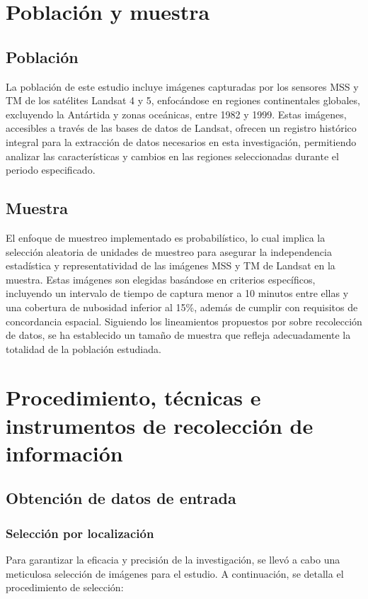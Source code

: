          
    \section{Población y muestra}
    
        \subsection{Población}
            La población de este estudio incluye imágenes capturadas por los sensores MSS y TM de los satélites Landsat 4 y 5, enfocándose en regiones continentales globales, excluyendo la Antártida y zonas oceánicas, entre 1982 y 1999. Estas imágenes, accesibles a través de las bases de datos de Landsat, ofrecen un registro histórico integral para la extracción de datos necesarios en esta investigación, permitiendo analizar las características y cambios en las regiones seleccionadas durante el periodo especificado.

        \subsection{Muestra}
            El enfoque de muestreo implementado es probabilístico, lo cual implica la selección aleatoria de unidades de muestreo para asegurar la independencia estadística y representatividad de las imágenes MSS y TM de Landsat en la muestra. Estas imágenes son elegidas basándose en criterios específicos, incluyendo un intervalo de tiempo de captura menor a 10 minutos entre ellas y una cobertura de nubosidad inferior al 15\%, además de cumplir con requisitos de concordancia espacial. Siguiendo los lineamientos propuestos por \textcite{hernandez2014recoleccion} sobre recolección de datos, se ha establecido un tamaño de muestra que refleja adecuadamente la totalidad de la población estudiada.
    \section{Procedimiento, técnicas e instrumentos de recolección de información}

       \subsection{Obtención de datos de entrada}
            \subsubsection{Selección por localización}
                Para garantizar la eficacia y precisión de la investigación, se llevó a cabo una meticulosa selección de imágenes para el estudio. A continuación, se detalla el procedimiento de selección:
                
